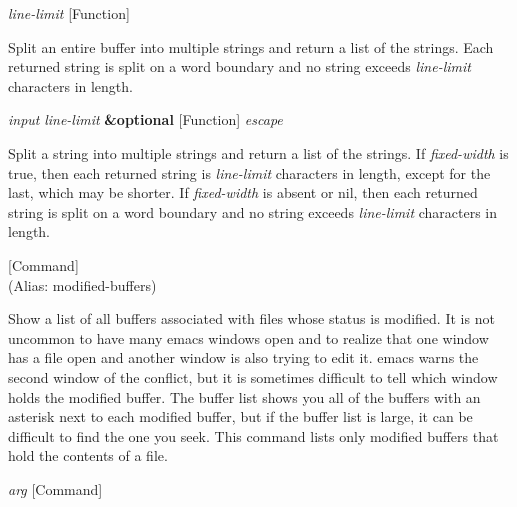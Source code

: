 \vspace{1em}
\noindent
{}
\usebox{\funcname}\emph{line-limit}
 \hfill [Function]

\begin{doc-string}
Split an entire buffer into multiple strings and return a list of the
strings.  Each returned string is split on a word boundary and no string exceeds
\emph{line-limit} characters in length.
\end{doc-string}

\vspace{1em}
\noindent
{}
\usebox{\funcname}\emph{input} \emph{line-limit} \textbf{\&optional}
 \hfill [Function]
\hspace*{\wd\funcname}\emph{escape}

\begin{doc-string}
Split a string into multiple strings and return a list of the strings.  If
\emph{fixed-width} is true, then each returned string is \emph{line-limit} characters in
length, except for the last, which may be shorter.  If \emph{fixed-width} is absent or
nil, then each returned string is split on a word boundary and no string exceeds
\emph{line-limit} characters in length.
\end{doc-string}

\vspace{1em}
\noindent
{}
\usebox{\funcname}
 \hfill [Command]\\%
 (Alias: modified-buffers)

\begin{doc-string}
Show a list of all buffers associated with files whose status is modified.
It is not uncommon to have many emacs windows open and to realize that one
window has a file open and another window is also trying to edit it.  emacs
warns the second window of the conflict, but it is sometimes difficult to tell
which window holds the modified buffer.  The buffer list shows you all of the
buffers with an asterisk next to each modified buffer, but if the buffer list
is large, it can be difficult to find the one you seek.  This command lists
only modified buffers that hold the contents of a file.
\end{doc-string}

\vspace{1em}
\noindent
{}
\usebox{\funcname}\emph{arg}
 \hfill [Command]

